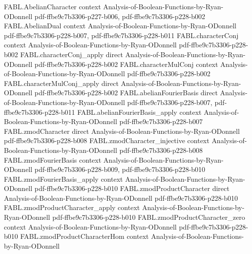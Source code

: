 \begin{theorem}
\label{FABL.zmodProductCharacter_add}
\leanok
{}
\proofstep
  {FABL.AbelianCharacter}
  {context}
  {Analysis-of-Boolean-Functions-by-Ryan-ODonnell}
  {pdf-ffbe9c7b3306-p227-b006,
    pdf-ffbe9c7b3306-p228-b002}
\proofstep
  {FABL.AbelianDual}
  {context}
  {Analysis-of-Boolean-Functions-by-Ryan-ODonnell}
  {pdf-ffbe9c7b3306-p228-b007,
    pdf-ffbe9c7b3306-p228-b011}
\proofstep
  {FABL.characterConj}
  {context}
  {Analysis-of-Boolean-Functions-by-Ryan-ODonnell}
  {pdf-ffbe9c7b3306-p228-b002}
\proofstep
  {FABL.characterConj_apply}
  {direct}
  {Analysis-of-Boolean-Functions-by-Ryan-ODonnell}
  {pdf-ffbe9c7b3306-p228-b002}
\proofstep
  {FABL.characterMulConj}
  {context}
  {Analysis-of-Boolean-Functions-by-Ryan-ODonnell}
  {pdf-ffbe9c7b3306-p228-b002}
\proofstep
  {FABL.characterMulConj_apply}
  {direct}
  {Analysis-of-Boolean-Functions-by-Ryan-ODonnell}
  {pdf-ffbe9c7b3306-p228-b002}
\proofstep
  {FABL.abelianFourierBasis}
  {direct}
  {Analysis-of-Boolean-Functions-by-Ryan-ODonnell}
  {pdf-ffbe9c7b3306-p228-b007,
    pdf-ffbe9c7b3306-p228-b011}
\proofstep
  {FABL.abelianFourierBasis_apply}
  {context}
  {Analysis-of-Boolean-Functions-by-Ryan-ODonnell}
  {pdf-ffbe9c7b3306-p228-b007}
\proofstep
  {FABL.zmodCharacter}
  {direct}
  {Analysis-of-Boolean-Functions-by-Ryan-ODonnell}
  {pdf-ffbe9c7b3306-p228-b008}
\proofstep
  {FABL.zmodCharacter_injective}
  {context}
  {Analysis-of-Boolean-Functions-by-Ryan-ODonnell}
  {pdf-ffbe9c7b3306-p228-b008}
\proofstep
  {FABL.zmodFourierBasis}
  {context}
  {Analysis-of-Boolean-Functions-by-Ryan-ODonnell}
  {pdf-ffbe9c7b3306-p228-b009,
    pdf-ffbe9c7b3306-p228-b010}
\proofstep
  {FABL.zmodFourierBasis_apply}
  {context}
  {Analysis-of-Boolean-Functions-by-Ryan-ODonnell}
  {pdf-ffbe9c7b3306-p228-b010}
\proofstep
  {FABL.zmodProductCharacter}
  {direct}
  {Analysis-of-Boolean-Functions-by-Ryan-ODonnell}
  {pdf-ffbe9c7b3306-p228-b010}
\proofstep
  {FABL.zmodProductCharacter_apply}
  {context}
  {Analysis-of-Boolean-Functions-by-Ryan-ODonnell}
  {pdf-ffbe9c7b3306-p228-b010}
\proofstep
  {FABL.zmodProductCharacter_zero}
  {context}
  {Analysis-of-Boolean-Functions-by-Ryan-ODonnell}
  {pdf-ffbe9c7b3306-p228-b010}
\proofstep
  {FABL.zmodProductCharacterHom}
  {context}
  {Analysis-of-Boolean-Functions-by-Ryan-ODonnell}

\end{theorem}
